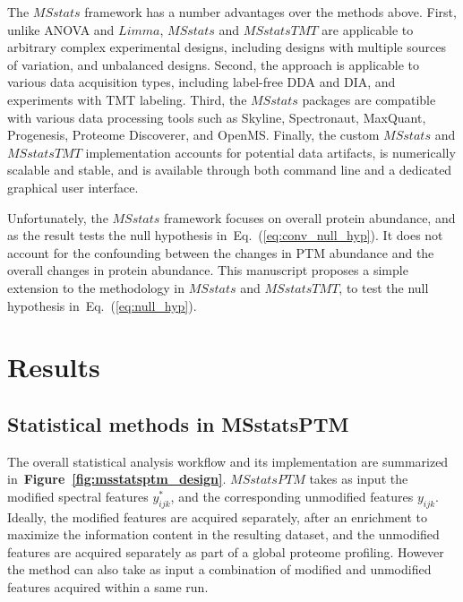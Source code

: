 \documentclass[mcp]{article}
\numberwithin{table}{section}
\def\eqref#1{Eq.~(\ref{eq:#1})}
\def\figref#1{{\bf Figure~\ref{fig:#1}}}
\begin{document}
The $MSstats$ framework has a number advantages over the methods above. 
First, unlike ANOVA and $Limma$, $MSstats$ and $MSstatsTMT$ are applicable to arbitrary complex experimental designs, including designs with multiple sources of variation, and unbalanced designs. 
Second, the approach is applicable to various data acquisition types, including label-free DDA and DIA, and experiments with TMT labeling. 
Third, the $MSstats$ packages are compatible with various data processing tools such as Skyline, Spectronaut, MaxQuant, Progenesis, Proteome Discoverer, and OpenMS. 
Finally, the custom $MSstats$ and $MSstatsTMT$ implementation accounts for potential data artifacts, is numerically scalable and stable, and is available through both command line and a dedicated graphical user interface.

Unfortunately, the $MSstats$ framework focuses on overall protein abundance, and as the result tests the null hypothesis in~\eqref{conv_null_hyp}. It does not account for the confounding between the changes in PTM abundance and the overall changes in protein abundance. This manuscript proposes a simple extension to the methodology in $MSstats$ and $MSstatsTMT$, to test the null hypothesis in~\eqref{null_hyp}.

\section{Results}

\subsection*{Statistical methods in MSstatsPTM}
\label{sec:adjustment_summary}

\medskip {}

\medskip \noindent
The overall statistical analysis workflow and its implementation are summarized in~\figref{msstatsptm_design}. $MSstatsPTM$ takes as input the modified spectral features $y_{ijk}^{\ast}$, and the corresponding unmodified features $y_{ijk}$. Ideally, the modified features are acquired separately, after an enrichment to maximize the information content in the resulting dataset, and the unmodified features are acquired separately as part of a global proteome profiling. However the method can also take as input a combination of modified and unmodified features acquired within a same run. 
\end{document}
